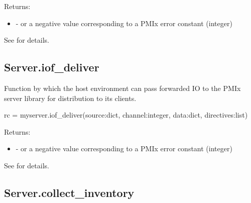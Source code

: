 Returns:

\begin{itemize}
    \item {} -  or a negative value corresponding to a PMIx error constant (integer)
\end{itemize}

See  for details.


\subsection{Server.iof_deliver}

\summary
Function by which the host environment can pass forwarded \ac{IO} to the \ac{PMIx} server library for distribution to its clients.

\format

\pyspecificstart
\begin{codepar}
rc = myserver.iof_deliver(source:dict, channel:integer,
                          data:dict, directives:list)
\end{codepar}
\pyspecificend


\begin{arglist}
\end{arglist}

Returns:

\begin{itemize}
    \item {} -  or a negative value corresponding to a PMIx error constant (integer)
\end{itemize}

See  for details.


\subsection{Server.collect_inventory}


